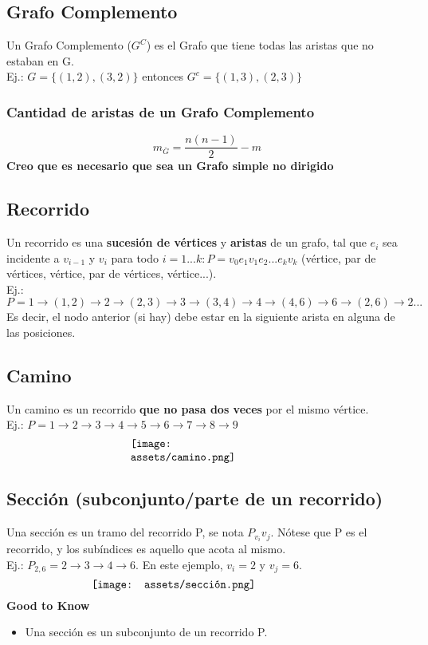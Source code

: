 \documentclass[10pt,a4paper]{article}
\begin{document}
\subsection*{Grafo Complemento}
Un Grafo Complemento ($G^{C}$) es el Grafo que tiene todas las aristas que no estaban en G. \\
Ej.: $G = \{(1, 2), (3, 2)\}$ entonces $ G^{c} = \{(1, 3), (2, 3)\}$
\subsubsection*{Cantidad de aristas de un Grafo Complemento}
\[m_{\overline{G}} = \frac{n(n-1)}{2} - m\]
\textbf{Creo que es necesario que sea un Grafo simple no dirigido}
\subsection*{Recorrido}
Un recorrido es una \textbf{sucesión de vértices} y \textbf{aristas} de un grafo, tal que $e_{i}$ sea incidente a $v_{i-1}$ y $v_{i}$ para todo $i = 1...k : P = v_{0}e_{1}v_{1}e_{2}...e_{k}v_{k}$ (vértice, par de vértices, vértice, par de vértices, vértice...). \\
Ej.: $P = 1 \rightarrow (1,2) \rightarrow 2 \rightarrow (2,3) \rightarrow 3 \rightarrow (3,4) \rightarrow 4 \rightarrow (4,6) \rightarrow 6 \rightarrow (2,6) \rightarrow 2 ...$ \\
Es decir, el nodo anterior (si hay) debe estar en la siguiente arista en alguna de las posiciones.
\subsection*{Camino}
Un camino es un recorrido \textbf{que no pasa dos veces} por el mismo vértice. \\
Ej.: $P = 1 \rightarrow 2 \rightarrow 3 \rightarrow 4 \rightarrow 5 \rightarrow 6 \rightarrow 7 \rightarrow 8 \rightarrow 9$
\[\begin{minipage}[b]{0.4\textwidth}
    \texttt{[image: assets/camino.png]}
\end{minipage}\]
\subsection*{Sección (subconjunto/parte de un recorrido)}
Una sección es un tramo del recorrido P, se nota $P_{v_{i}}{v_{j}}$. Nótese que P es el recorrido, y los subíndices es aquello que acota al mismo. \\
Ej.: $P_{2,6} = 2 \rightarrow 3 \rightarrow 4 \rightarrow 6$. En este ejemplo, $v_{i} = 2$ y $v_{j} = 6$.
\[\begin{minipage}[b]{0.6\textwidth}
    \texttt{[image: assets/sección.png]}
\end{minipage}\]
\textbf{Good to Know}
\begin{itemize}
    \item Una sección es un subconjunto de un recorrido P.
\end{itemize}
\end{document}
